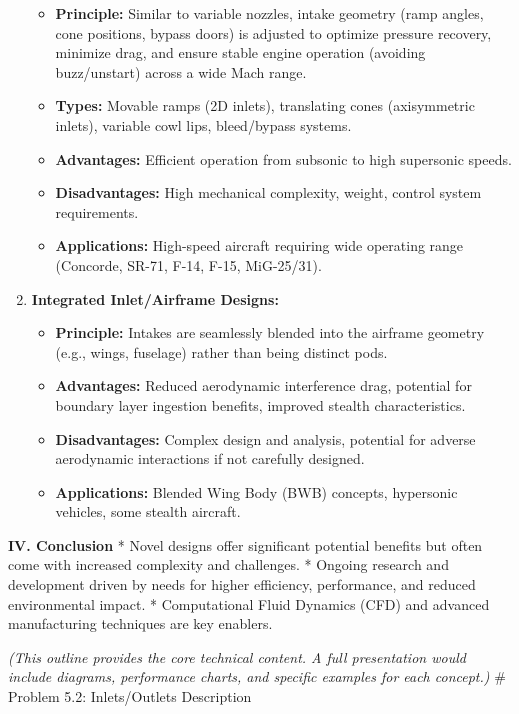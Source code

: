 \begin{enumerate}
  \begin{itemize}
  \tightlist
  \item
    \textbf{Principle:} Similar to variable nozzles, intake geometry
    (ramp angles, cone positions, bypass doors) is adjusted to optimize
    pressure recovery, minimize drag, and ensure stable engine operation
    (avoiding buzz/unstart) across a wide Mach range.
  \item
    \textbf{Types:} Movable ramps (2D inlets), translating cones
    (axisymmetric inlets), variable cowl lips, bleed/bypass systems.
  \item
    \textbf{Advantages:} Efficient operation from subsonic to high
    supersonic speeds.
  \item
    \textbf{Disadvantages:} High mechanical complexity, weight, control
    system requirements.
  \item
    \textbf{Applications:} High-speed aircraft requiring wide operating
    range (Concorde, SR-71, F-14, F-15, MiG-25/31).
  \end{itemize}
\item
  \textbf{Integrated Inlet/Airframe Designs:}

  \begin{itemize}
  \tightlist
  \item
    \textbf{Principle:} Intakes are seamlessly blended into the airframe
    geometry (e.g., wings, fuselage) rather than being distinct pods.
  \item
    \textbf{Advantages:} Reduced aerodynamic interference drag,
    potential for boundary layer ingestion benefits, improved stealth
    characteristics.
  \item
    \textbf{Disadvantages:} Complex design and analysis, potential for
    adverse aerodynamic interactions if not carefully designed.
  \item
    \textbf{Applications:} Blended Wing Body (BWB) concepts, hypersonic
    vehicles, some stealth aircraft.
  \end{itemize}
\end{enumerate}

\textbf{IV. Conclusion} * Novel designs offer significant potential
benefits but often come with increased complexity and challenges. *
Ongoing research and development driven by needs for higher efficiency,
performance, and reduced environmental impact. * Computational Fluid
Dynamics (CFD) and advanced manufacturing techniques are key enablers.

\emph{(This outline provides the core technical content. A full
presentation would include diagrams, performance charts, and specific
examples for each concept.)} \# Problem 5.2: Inlets/Outlets Description

